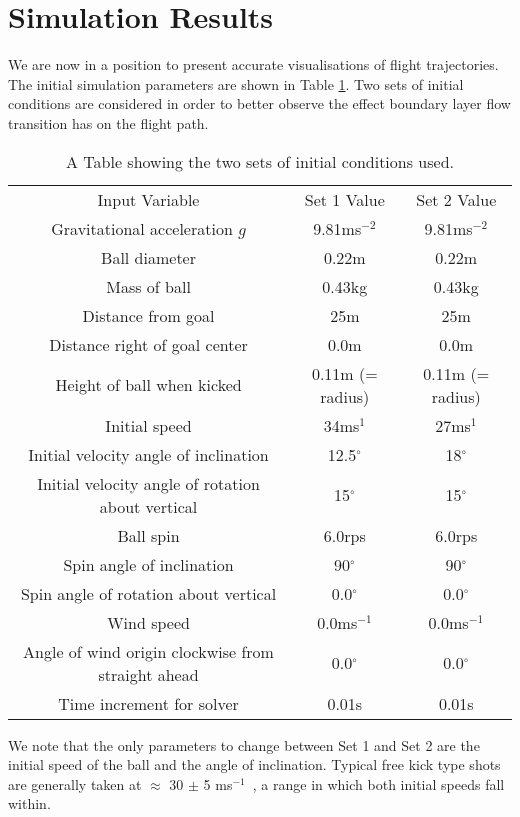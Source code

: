\documentclass[a4paper]{article}
\begin{document}
\section{Simulation Results}
\label{sect:SimulationResults}
We are now in a position to present accurate visualisations of flight trajectories.  The initial simulation parameters are shown in Table \ref{table:InitialValues}.  Two sets of initial conditions are considered in order to better observe the effect boundary layer flow transition has on the flight path. 
%
%
\begin{table}[ht]
\centering
\begin{tabular}{c | c | c}
 \hline
\noalign{\vspace{3pt}}
    Input Variable & Set 1 Value & Set 2 Value  \\
\noalign{\vspace{3pt}}
    \hline 
    \hline
\noalign{\vspace{3pt}}
    Gravitational acceleration $g$ & 9.81ms$^{-2}$ & 9.81ms$^{-2}$\\\hline
    Ball diameter & 0.22m & 0.22m\\\hline 
    Mass of ball & 0.43kg & 0.43kg\\\hline 
    Distance from goal & 25m & 25m\\\hline 
    Distance right of goal center & 0.0m & 0.0m\\\hline 
    Height of ball when kicked & 0.11m (= radius) & 0.11m (= radius)\\\hline 
    Initial speed & 34ms$^{1}$ & 27ms$^{1}$\\\hline
	Initial velocity angle of inclination & 12.5$^{\circ}$ & 18$^{\circ}$\\\hline
	Initial velocity angle of rotation about vertical & 15$^{\circ}$ & 15$^{\circ}$\\\hline
	Ball spin & 6.0rps & 6.0rps\\\hline
	Spin angle of inclination & 90$^{\circ}$ & 90$^{\circ}$\\\hline
	Spin angle of rotation about vertical & 0.0$^{\circ}$ & 0.0$^{\circ}$\\\hline
	Wind speed & 0.0ms$^{-1}$ & 0.0ms$^{-1}$\\\hline
	Angle of wind origin clockwise from straight ahead & 0.0$^{\circ}$ & 0.0$^{\circ}$\\\hline
	Time increment for solver & 0.01s & 0.01s\\\hline
\end{tabular}
\caption{A Table showing the two sets of initial conditions used.}
\label{table:InitialValues}
\end{table}
%
%
We note that the only parameters to change between Set 1 and Set 2 are the initial speed of the ball and the angle of inclination.  Typical free kick type shots are generally taken at $\approx$ 30 $\pm$ 5 ms$^{-1}$~\cite{JEGoff, AsaiTSeoKKobayashiOandSakashitaR, CarreMJAsaiTAkatsukaTandHaakeSJ, BrayKandKerwinDG}, a range in which both initial speeds fall within.  
\end{document}
